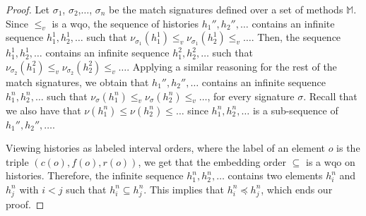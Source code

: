 \begin{proof}
Let $\sigma_1$, $\sigma_2$,$\ldots$, $\sigma_n$ be the match signatures defined over a set of methods $\mathbb{M}$.
Since $\leq_v$ is a wqo, the sequence of histories $h_1'',h_2'',\ldots$ contains an
infinite sequence $h_{1}^1,h_{2}^1,\ldots$ such that
$\nu_{\sigma_1}(h_{1}^1)\leq_v \nu_{\sigma_1}(h_{2}^1)\leq_v \ldots$.
Then, the sequence $h_{1}^1,h_{2}^1,\ldots$ contains
an infinite sequence $h_{1}^2,h_{2}^2,\ldots$ such that
$\nu_{\sigma_2}(h_{1}^2)\leq_v \nu_{\sigma_2}(h_{2}^2)\leq_v \ldots$.
Applying a similar reasoning for the rest of the match signatures,
we obtain that $h_1'',h_2'',\ldots$ contains an
infinite sequence $h_{1}^n,h_{2}^n,\ldots$
such that
$\nu_{\sigma}(h_{1}^n)\leq_v \nu_{\sigma}(h_{2}^n)\leq_v \ldots$, for every signature $\sigma$.
Recall that we also have that
$\nu(h_1^n)\leq\nu(h_2^n)\leq\ldots$ since $h_{1}^n,h_{2}^n,\ldots$ is a sub-sequence of $h_1'',h_2'',\ldots$.

Viewing histories as labeled interval orders, where the label of an element $o$ is the triple $(c(o),f(o),r(o))$,
we get that the embedding order $\subseteq$ is a wqo on histories. Therefore, the infinite sequence
$h_{1}^n,h_{2}^n,\ldots$  contains two elements $h_{i}^n$ and $h_j^n$ with $i<j$ such that $h_{i}^n\subseteq h_j^n$.
This implies that $h_i^n\preceq h_j^n$, which ends our proof.
\end{proof}
